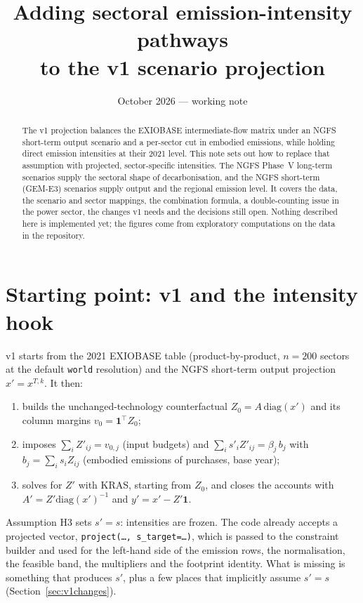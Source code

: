 \documentclass[11pt,a4paper]{article}
\title{Adding sectoral emission-intensity pathways\\to the v1 scenario projection}
\author{}
\date{October 2026 --- working note}
\newcommand{\code}[1]{\texttt{#1}}
\begin{document}
\maketitle

\begin{abstract}
The v1 projection balances the EXIOBASE intermediate-flow matrix under an NGFS
short-term output scenario and a per-sector cut in embodied emissions, while
holding direct emission intensities at their 2021 level. This note sets out how
to replace that assumption with projected, sector-specific intensities. The
NGFS Phase~V long-term scenarios supply the sectoral shape of decarbonisation,
and the NGFS short-term (GEM-E3) scenarios supply output and the regional
emission level. It covers the data, the scenario and sector mappings, the
combination formula, a double-counting issue in the power sector, the changes
v1 needs and the decisions still open. Nothing described here is implemented
yet; the figures come from exploratory computations on the data in the
repository.
\end{abstract}

\tableofcontents

\section{Starting point: v1 and the intensity hook}

v1 starts from the 2021 EXIOBASE table (product-by-product, $n=200$ sectors at
the default \code{world} resolution) and the NGFS short-term output
projection $x' = x^{T,k}$. It then:
\begin{enumerate}
  \item builds the unchanged-technology counterfactual $Z_0 = A\,\mathrm{diag}(x')$
        and its column margins $v_0 = \mathbf{1}^\top Z_0$;
  \item imposes $\sum_i Z'_{ij} = v_{0,j}$ (input budgets) and
        $\sum_i s'_i Z'_{ij} = \beta_j\, b_j$ with $b_j = \sum_i s_i Z_{ij}$
        (embodied emissions of purchases, base year);
  \item solves for $Z'$ with KRAS, starting from $Z_0$, and closes the accounts
        with $A' = Z'\mathrm{diag}(x')^{-1}$ and $y' = x' - Z'\mathbf{1}$.
\end{enumerate}

Assumption H3 sets $s' = s$: intensities are frozen. The code already accepts
a projected vector, \code{project(\dots, s\_target=\dots)}, which is passed to
the constraint builder and used for the left-hand side of the emission rows,
the normalisation, the feasible band, the multipliers and the footprint
identity. What is missing is something that produces $s'$, plus a few places
that implicitly assume $s' = s$ (Section~\ref{sec:v1changes}).
\end{document}
